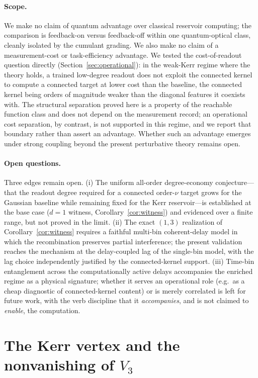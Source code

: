 \documentclass[11pt]{article}
\theoremstyle{remark}
\begin{document}
\paragraph{Scope.}
We make no claim of quantum advantage over classical reservoir computing; the
comparison is feedback-on versus feedback-off within one quantum-optical class,
cleanly isolated by the cumulant grading. We also make no claim of a
measurement-cost or task-efficiency advantage. We tested the cost-of-readout
question directly (Section~\ref{sec:operational}): in the weak-Kerr regime where
the theory holds, a trained low-degree readout does not exploit the connected
kernel to compute a connected target at lower cost than the baseline, the
connected kernel being orders of magnitude weaker than the diagonal features it
coexists with. The structural separation proved here is a property of the
reachable function class and does not depend on the measurement record; an
operational cost separation, by contrast, is not supported in this regime, and we
report that boundary rather than assert an advantage. Whether such an advantage
emerges under strong coupling beyond the present perturbative theory remains open.

\paragraph{Open questions.}
Three edges remain open. (i) The uniform all-order degree-economy
conjecture---that the readout degree required for a connected order-$\nu$ target
grows for the Gaussian baseline while remaining fixed for the Kerr
reservoir---is established at the base case ($d=1$ witness,
Corollary~\ref{cor:witness}) and evidenced over a finite range, but not proved in
the limit. (ii) The exact $(1,3)$ realization of Corollary~\ref{cor:witness}
requires a faithful multi-bin coherent-delay model in which the recombination
preserves partial interference; the present validation reaches the mechanism at
the delay-coupled lag of the single-bin model, with the lag choice independently
justified by the connected-kernel support. (iii) Time-bin entanglement across the
computationally active delays accompanies the enriched regime as a physical
signature; whether it serves an operational role (e.g.\ as a cheap diagnostic of
connected-kernel content) or is merely correlated is left for future work, with
the verb discipline that it \emph{accompanies}, and is not claimed to
\emph{enable}, the computation.


\appendix
\section{The Kerr vertex and the nonvanishing of \texorpdfstring{$V_3$}{V3}}
\label{app:vertex}
\end{document}
